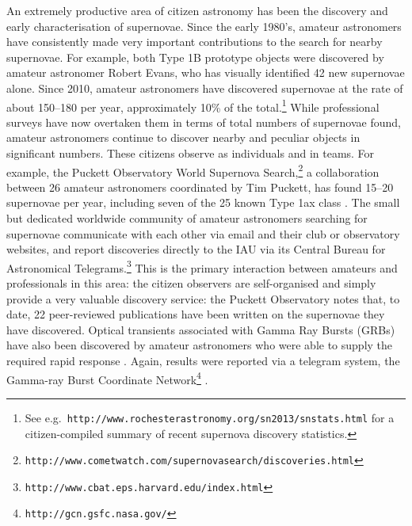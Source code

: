 \documentclass{ar2e}
\def\CaseStudy#1{\noindent{\it\bf #1 \,\,\,\,}}
\def\url#1{\texttt{#1}}
\begin{document}
\CaseStudy{Extragalactic Transients: Supernovae and GRBs.}
An extremely productive area of citizen astronomy has been the discovery and
early characterisation of supernovae. Since the early 1980's, 
amateur astronomers have consistently made very important contributions to the
search for nearby supernovae. For example, both Type 1B prototype objects
\citep[SN1983N and SN1984L,][]{Porter+Filippenko} were discovered by
amateur astronomer Robert Evans, who has visually identified 42 new supernovae
alone. Since 2010, amateur astronomers have
discovered  supernovae at the rate of about 150--180 per year, approximately
10\% of the total.\footnote{See e.g.\
\url{http://www.rochesterastronomy.org/sn2013/snstats.html} for a
citizen-compiled summary of recent supernova discovery statistics.}  While
professional surveys have now overtaken them in terms of total numbers of
supernovae found,  amateur astronomers continue to discover nearby and peculiar
objects in significant numbers. These citizens observe as individuals and in
teams. For example, the Puckett Observatory World Supernova 
Search,\footnote{\url{http://www.cometwatch.com/supernovasearch/discoveries.html}}
a collaboration between 26 amateur astronomers coordinated by Tim Puckett, has
found 15--20 supernovae per year, including seven of the 25 known Type 1ax class
\citep{Foley2013}. The small but dedicated worldwide community 
of amateur astronomers
searching for supernovae communicate with each other via email and their club or 
observatory websites, and report discoveries directly to the IAU via its Central
Bureau for Astronomical 
Telegrams.\footnote{\url{http://www.cbat.eps.harvard.edu/index.html}} This is
the primary interaction between amateurs and professionals in this area: the
citizen observers are self-organised and simply provide a very valuable
discovery service: the Puckett Observatory notes that, to date, 22 peer-reviewed
publications have been written on the supernovae they have discovered.
Optical transients associated with Gamma Ray Bursts (GRBs) have also been
discovered by amateur astronomers who were 
able to supply the required rapid response
\citep[][]{Oksanen2008}. Again, results were reported via a telegram system, the
Gamma-ray Burst Coordinate Network\footnote{\url{http://gcn.gsfc.nasa.gov/}} 
\citep{Monard2003,Oksanen2007}. 



\vspace{\baselineskip}
\end{document}
